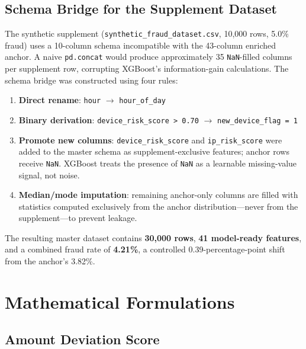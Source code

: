 \documentclass[conference]{IEEEtran}
\begin{document}
\subsection{Schema Bridge for the Supplement Dataset}

The synthetic supplement (\texttt{synthetic\_fraud\_dataset.csv},
10{,}000 rows, 5.0\% fraud) uses a 10-column schema incompatible with the
43-column enriched anchor. A naive \texttt{pd.concat} would produce
approximately 35 \texttt{NaN}-filled columns per supplement row, corrupting
XGBoost's information-gain calculations. The schema bridge was constructed
using four rules:

\begin{enumerate}
    \item \textbf{Direct rename}: \texttt{hour} $\rightarrow$ \texttt{hour\_of\_day}
    \item \textbf{Binary derivation}: \texttt{device\_risk\_score > 0.70}
          $\rightarrow$ \texttt{new\_device\_flag = 1}
    \item \textbf{Promote new columns}: \texttt{device\_risk\_score} and
          \texttt{ip\_risk\_score} were added to the master schema as
          supplement-exclusive features; anchor rows receive \texttt{NaN}.
          XGBoost treats the presence of \texttt{NaN} as a learnable
          missing-value signal, not noise.
    \item \textbf{Median/mode imputation}: remaining anchor-only columns
          are filled with statistics computed exclusively from the anchor
          distribution---never from the supplement---to prevent leakage.
\end{enumerate}

The resulting master dataset contains \textbf{30{,}000 rows},
\textbf{41 model-ready features}, and a combined fraud rate of \textbf{4.21\%},
a controlled 0.39-percentage-point shift from the anchor's 3.82\%.

\section{Mathematical Formulations}

\subsection{Amount Deviation Score}
\end{document}
